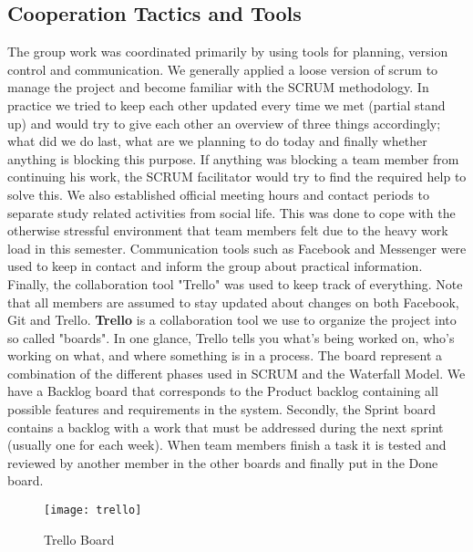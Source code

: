 \subsection{Cooperation Tactics and Tools}
The group work was coordinated primarily by using tools for planning, version control and communication. We generally applied a loose version of scrum to manage the project and become familiar with the SCRUM methodology. In practice we tried to keep each other updated every time we met (partial stand up) and would try to give each other an overview of three things accordingly; what did we do last, what are we planning to do today and finally whether anything is blocking this purpose. If anything was blocking a team member from continuing his work, the SCRUM facilitator would try to find the required help to solve this. 
We also established official meeting hours and contact periods to separate study related activities from social life. This was done to cope with the otherwise stressful environment that team members felt due to the heavy work load in this semester. Communication tools such as Facebook and Messenger were used to keep in contact and inform the group about practical information. Finally, the collaboration tool "Trello"  was used to keep track of everything. Note that all members are assumed to stay updated about changes on both Facebook, Git and Trello. 
\textbf{Trello} is a collaboration tool we use to organize the project into so called "boards". In one glance, Trello tells you what's being worked on, who's working on what, and where something is in a process. The board represent a combination of the different phases used in SCRUM and the Waterfall Model. We have a Backlog board that corresponds to the Product backlog containing all possible features and requirements in the system. Secondly, the Sprint board contains a backlog with a work that must be addressed during the next sprint (usually one for each week). When team members finish a task it is tested and reviewed by another member in the other boards and finally put in the Done board. 

\begin{figure}[H]
	\texttt{[image: trello]}
	\caption{Trello Board}
	\label{fig:trello}
\end{figure}
